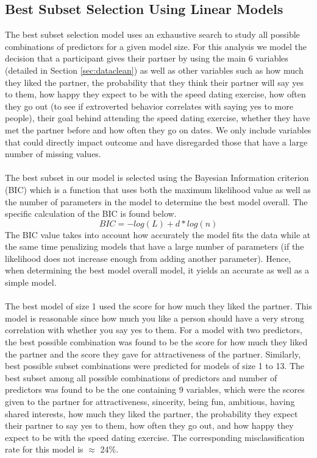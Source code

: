 \documentclass{article}
\begin{document}
\subsection{Best Subset Selection Using Linear Models}
\label{sec:bestsubsetsection}
The best subset selection model uses an exhaustive search to study all possible combinations of predictors for a given model size.  For this analysis we model the decision that a participant gives their partner by using the main 6 variables (detailed in Section \ref{sec:dataclean}) as well as other variables such as how much they liked the partner, the probability that they think their partner will say yes to them, how happy they expect to be with the speed dating exercise, how often they go out (to see if extroverted behavior correlates with saying yes to more people), their goal behind attending the speed dating exercise, whether they have met the partner before and how often they go on dates. We only include variables that could directly impact outcome and have disregarded those that have a large number of missing values. \\
\null\\
The best subset in our model is selected using the Bayesian Information criterion (BIC) which is a function that uses both the maximum likelihood value as well as the number of parameters in the model to determine the best model overall.  The specific calculation of the BIC is found below.
\begin{equation}
BIC=-log(L)+d*log(n)
\label{eq:BIC}
\end{equation}
The BIC value takes into account how accurately the model fits the data while at the same time penalizing models that have a large number of parameters (if the likelihood does not increase enough from adding another parameter). Hence, when determining the best model overall model, it yields an accurate as well as a simple model.\\
\null\\
The best model of size 1 used the score for how much they liked the partner.  This model is reasonable since how much you like a person should have a very strong correlation with whether you say yes to them. For a model with two predictors, the best possible combination was found to be the score for how much they liked the partner and the score they gave for attractiveness of the partner.  Similarly, best possible subset combinations were predicted for models of size 1 to 13. The best subset among all possible combinations of predictors and number of predictors was found to be the one containing 9 variables, which were the scores given to the partner for attractiveness, sincerity, being fun, ambitious, having shared interests, how much they liked the partner, the probability they expect their partner to say yes to them, how often they go out, and how happy they expect to be with the speed dating exercise.  The corresponding misclassification rate for this model is $\approx$ 24\%.\\
\end{document}
